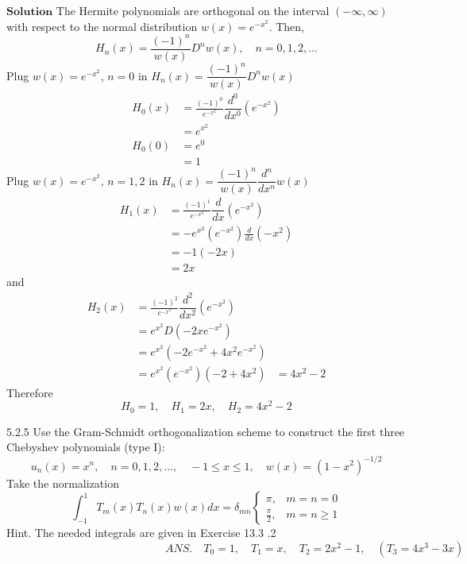 $\boxed{\textbf{Solution}}$ The Hermite polynomials are orthogonal on the interval $(-\infty, \infty)$ with respect to the normal
distribution $w(x)=e^{-x^{2}}$. Then,
$$
H_{n}(x)=\frac{(-1)^{n}}{w(x)} D^{n} w(x),\quad n=0,1,2, \ldots
$$
Plug $w(x)=e^{-x^{2}}$, $n=0$ in $H_{n}(x)=\dfrac{(-1)^{n}}{w(x)} D^{n} w(x)$
$$
\begin{aligned}
H_{0}(x) &=\frac{(-1)^{0}}{e^{-x^{2}}} \dfrac{d^0}{dx^0}\left(e^{-x^{2}}\right) \\
&=e^{x^{2}} \\
H_{0}(0) &=e^{0} \\
&=1
\end{aligned}
$$
Plug $w(x)=e^{-x^{2}}$, $n=1,2$ in $H_{n}(x)=\dfrac{(-1)^{n}}{w(x)} \dfrac{d^n}{dx^n} w(x)$
$$
\begin{aligned}
H_{1}(x) &=\frac{(-1)^{1}}{e^{-x^{2}}} \dfrac{d}{dx}\left(e^{-x^{2}}\right) \\
&=-e^{x^{2}}\left(e^{-x^{2}}\right) \frac{d}{d x}\left(-x^{2}\right) \\
&=-1(-2 x) \\
&=2 x
\end{aligned}
$$
and
$$
\begin{aligned}
H_{2}(x) &=\frac{(-1)^{2}}{e^{-x^{2}}} \dfrac{d^2}{dx^2}\left(e^{-x^{2}}\right) \\
&=e^{x^{2}} D\left(-2 x e^{-x^{2}}\right) \\
&=e^{x^{2}}\left(-2 e^{-x^{2}}+4 x^{2} e^{-x^{2}}\right) \\
&=e^{x^{2}}\left(e^{-x^{2}}\right)\left(-2+4 x^{2}\right)
&=4x^2-2
\end{aligned}
$$
Therefore
$$H_{0}=1, \quad H_{1}=2 x, \quad H_{2}=4 x^{2}-2$$


\newpage

\begin{mybox}{5.2.5}
Use the Gram-Schmidt orthogonalization scheme to construct the first three Chebyshev polynomials (type I):
$$
u_{n}(x)=x^{n}, \quad n=0,1,2, \ldots, \quad-1 \leq x \leq 1, \quad w(x)=\left(1-x^{2}\right)^{-1 / 2}
$$
Take the normalization
$$
\int_{-1}^{1} T_{m}(x) T_{n}(x) w(x) d x=\delta_{m n}\left\{\begin{array}{ll}
\pi, & m=n=0 \\
\frac{\pi}{2}, & m=n \geq 1
\end{array}\right.
$$
Hint. The needed integrals are given in Exercise 13.3 .2
$$\hspace{6cm} ANS.\quad T_{0}=1, \quad T_{1}=x, \quad T_{2}=2 x^{2}-1, \quad\left(T_{3}=4 x^{3}-3 x\right)$$
\end{mybox}

